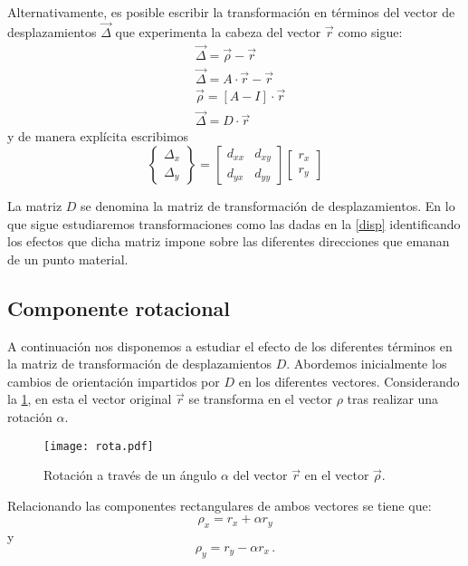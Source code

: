 \documentclass[../notas medios.tex]{subfiles}
\begin{document}
Alternativamente, es posible escribir la transformación en términos del vector 
de desplazamientos $\vec {\Delta}$  que experimenta la cabeza del vector 
$\vec{r}$ como sigue:  
\begin{align*}
&\vec \Delta  = \vec \rho  - \vec r\\
&\vec \Delta  = A \cdot \vec r - \vec r\\
&\vec \rho  = \left[ {A - I} \right] \cdot \vec r\\
&\vec \Delta  = D \cdot \vec r
\end{align*}
y de manera explícita escribimos
\begin{equation}
\begin{Bmatrix}
\Delta_x\\
\Delta_y
\end{Bmatrix}= 
\begin{bmatrix}
d_{xx} &d_{xy}\\
d_{yx} &d_{yy}
\end{bmatrix}
\begin{bmatrix}
r_x\\
r_y
\end{bmatrix}
\label{disp}
\end{equation}

La matriz $D$ se denomina la matriz de transformación de desplazamientos. En lo que sigue estudiaremos transformaciones como las dadas en la \cref{disp} identificando los efectos que dicha matriz impone sobre las diferentes direcciones que emanan de un punto material. 

\subsection{Componente rotacional}
A continuación nos disponemos a estudiar el efecto de los diferentes términos en la matriz de transformación de desplazamientos $D$. Abordemos inicialmente los cambios de orientación impartidos por $D$ en los diferentes vectores. Considerando la \cref{rota}, en esta el vector original $\vec{r}$ se transforma en el vector $\rho$ tras realizar una rotación $\alpha$. 

\begin{figure}[H]
\centering
	\texttt{[image: rota.pdf]}
	\caption{Rotación a través de un ángulo $\alpha$ del vector $\vec{r}$ en el 
	vector $\vec{\rho}$.}
	\label{rota}
\end{figure}


Relacionando las componentes rectangulares de ambos vectores se tiene que:
\[\rho_x = r_x + \alpha r_y\]
y
\[\rho_y = r_y - \alpha r_x\, .\]
\end{document}
